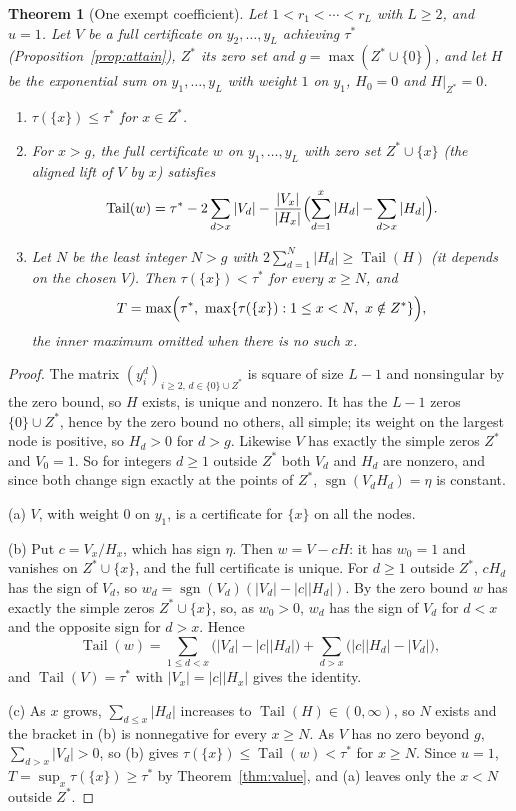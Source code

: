 \documentclass[11pt]{article}
\newtheorem{theorem}{Theorem}[section]
\theoremstyle{definition}
\theoremstyle{plain}
\DeclareMathOperator{\Tail}{Tail}
\DeclareMathOperator{\sgn}{sgn}
\begin{document}
\begin{theorem}[One exempt coefficient]\label{thm:halfmass}
Let $1<r_1<\cdots<r_L$ with $L\ge2$, and $u=1$.  Let $V$ be a full
certificate on $y_2,\ldots,y_L$ achieving $\tau^*$
(Proposition~\ref{prop:attain}), $Z^*$ its zero set and
$g=\max(Z^*\cup\{0\})$, and let $H$ be the exponential sum on
$y_1,\ldots,y_L$ with weight $1$ on $y_1$, $H_0=0$ and $H|_{Z^*}=0$.
\begin{enumerate}
\item[(a)] $\tau(\{x\})\le\tau^*$ for $x\in Z^*$.
\item[(b)] For $x>g$, the full certificate $w$ on $y_1,\ldots,y_L$ with
zero set $Z^*\cup\{x\}$ (the \emph{aligned lift} of $V$ by $x$) satisfies
\[
  \Tail(w)=\tau^*-2\sum_{d>x}|V_d|
  -\frac{|V_x|}{|H_x|}\Bigl(\sum_{d=1}^{x}|H_d|-\sum_{d>x}|H_d|\Bigr).
\]
\item[(c)] Let $N$ be the least integer $N>g$ with
$2\sum_{d=1}^N|H_d|\ge\Tail(H)$ (it depends on the chosen $V$).  Then $\tau(\{x\})<\tau^*$ for every
$x\ge N$, and
\[
  T=\max\Bigl(\tau^*,\ \max\{\tau(\{x\}):1\le x<N,\ x\notin Z^*\}\Bigr),
\]
the inner maximum omitted when there is no such $x$.
\end{enumerate}
\end{theorem}

\begin{proof}
The matrix $(y_i^d)_{i\ge2,\,d\in\{0\}\cup Z^*}$ is square of size $L-1$ and
nonsingular by the zero bound, so $H$ exists, is unique and nonzero.  It has
the $L-1$ zeros $\{0\}\cup Z^*$, hence by the zero bound no others, all
simple; its weight on the largest node is positive, so $H_d>0$ for $d>g$.
Likewise $V$ has exactly the simple zeros $Z^*$ and $V_0=1$.  So for
integers $d\ge1$ outside $Z^*$ both $V_d$ and $H_d$ are nonzero, and since
both change sign exactly at the points of $Z^*$, $\sgn(V_dH_d)=\eta$ is
constant.

(a) $V$, with weight $0$ on $y_1$, is a certificate for $\{x\}$ on all the
nodes.

(b) Put $c=V_x/H_x$, which has sign $\eta$.  Then $w=V-cH$: it has
$w_0=1$ and vanishes on $Z^*\cup\{x\}$, and the full certificate is unique.
For $d\ge1$ outside $Z^*$, $cH_d$ has the sign of $V_d$, so
$w_d=\sgn(V_d)(|V_d|-|c||H_d|)$.  By the zero bound $w$ has exactly the
simple zeros $Z^*\cup\{x\}$, so, as $w_0>0$, $w_d$ has the sign of $V_d$ for
$d<x$ and the opposite sign for $d>x$.  Hence
\[
  \Tail(w)=\sum_{1\le d<x}\bigl(|V_d|-|c||H_d|\bigr)
  +\sum_{d>x}\bigl(|c||H_d|-|V_d|\bigr),
\]
and $\Tail(V)=\tau^*$ with $|V_x|=|c||H_x|$ gives the identity.

(c) As $x$ grows, $\sum_{d\le x}|H_d|$ increases to $\Tail(H)\in(0,\infty)$,
so $N$ exists and the bracket in (b) is nonnegative for every $x\ge N$.  As
$V$ has no zero beyond $g$, $\sum_{d>x}|V_d|>0$, so (b) gives
$\tau(\{x\})\le\Tail(w)<\tau^*$ for $x\ge N$.  Since $u=1$,
$T=\sup_x\tau(\{x\})\ge\tau^*$ by Theorem~\ref{thm:value}, and (a) leaves
only the $x<N$ outside $Z^*$.
\end{proof}
\end{document}
